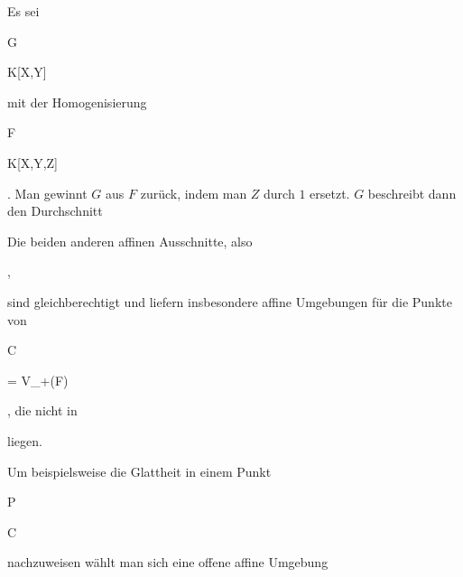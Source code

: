 {}

{


Es sei


\mavergleichskette

{\vergleichskette

{G
}

{ \in }{ K[X,Y]
}

{  }{
}

{    }{
}

{   }{
}

}
{}{}{}
mit der Homogenisierung


\mavergleichskette

{\vergleichskette

{F
}

{ \in }{ K[X,Y,Z]
}

{  }{
}

{    }{
}

{   }{
}

}
{}{}{.}
Man gewinnt $G$ aus $F$ zurück, indem man $Z$ durch $1$ ersetzt. $G$ beschreibt dann den Durchschnitt

 Die beiden anderen affinen Ausschnitte, also


 { , }


sind gleichberechtigt und liefern insbesondere affine Umgebungen für die Punkte von


\mavergleichskette

{\vergleichskette

{C
}

{ = }{ V_+(F)
}

{  }{
}

{    }{
}

{   }{
}

}
{}{}{,}
die nicht in

 liegen.


Um beispielsweise die Glattheit in einem Punkt


\mavergleichskette

{\vergleichskette

{P
}

{ \in }{ C
}

{  }{
}

{    }{
}

{   }{
}

}
{}{}{}
nachzuweisen wählt man sich eine offene affine Umgebung
}
